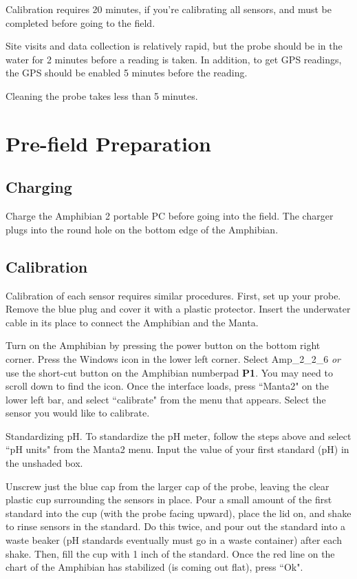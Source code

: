 \documentclass[12pt]{../SOP3}\usepackage[]{graphicx}\usepackage[]{color}
\begin{document}
\NP Calibration requires 20 minutes, if you're calibrating all sensors, and must be completed before going to the field.

\NP Site visits and data collection is relatively rapid, but the probe should be in the water for 2 minutes before a reading is taken. In addition, to get GPS readings, the GPS should be enabled 5 minutes before the reading.

\NP Cleaning the probe takes less than 5 minutes.

\section{Pre-field Preparation}

\subsection{Charging}

\NP Charge the Amphibian 2 portable PC before going into the field. The charger plugs into the round hole on the bottom edge of the Amphibian. 

\subsection{Calibration}

\NP Calibration of each sensor requires similar procedures. First, set up your probe. Remove the blue plug and cover it with a plastic protector. Insert the underwater cable in its place to connect the Amphibian and the Manta. 

\NP Turn on the Amphibian by pressing the power button on the bottom right corner. Press the Windows icon in the lower left corner. Select Amp\_2\_2\_6 \emph{or} use the short-cut button on the Amphibian numberpad \textbf{P1}. You may need to scroll down to find the icon. Once the interface loads, press ``Manta2" on the lower left bar, and select ``calibrate" from the menu that appears. Select the sensor you would like to calibrate. 

\NP Standardizing pH. To standardize the pH meter, follow the steps above and select ``pH units" from the Manta2 menu. Input the value of your first standard (pH) in the unshaded box. 

\NP Unscrew just the blue cap from the larger cap of the probe, leaving the clear plastic cup surrounding the sensors in place. Pour a small amount of the first standard into the cup (with the probe facing upward), place the lid on, and shake to rinse sensors in the standard. Do this twice, and pour out the standard into a waste beaker (pH standards eventually must go in a waste container) after each shake. Then, fill the cup with 1 inch of the standard. Once the red line on the chart of the Amphibian has stabilized (is coming out flat), press ``Ok". 
\end{document}
